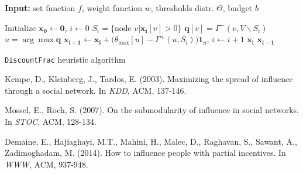 \documentclass[11pt]{article}
\renewcommand{\algorithmicrequire}{\textbf{Input:}}  %
\begin{document}
\begin{algorithm}[H]
	\algorithmicrequire { set function $f$, weight function $w$, thresholds distr. $\Theta$, budget $b$}
	\begin{algorithmic}
		\State Initialize $\mathbf{x_0} \leftarrow \mathbf{0}$, $i\leftarrow 0$
		\State $S_i = \{\text{node } v | \mathbf{x_i}[v] > 0\}$
		\State $\mathbf{q}[v] = \Gamma^-(v, V\backslash S_i)$
		\EndFor
		\State $u = \arg\max \mathbf{q}$
		\State $\mathbf{x_{i+1}} \leftarrow \mathbf{x_i} + \Big( \theta_{\max}[u] - \Gamma^+(u,S_i)\Big) \mathbf{1}_{u}$, $i\leftarrow i + 1$
		\EndWhile
		\State \Return $\mathbf{x_i}$
		\Else
		\State \Return $\mathbf{x_{i-1}}$
		\EndIf
	\end{algorithmic}
	\caption{\texttt{DiscountFrac} heuristic algorithm} \label{alg:frac_greedy}
\end{algorithm}





\begin{thebibliography}{}
	
	Kempe, D., Kleinberg, J., Tardos, E. (2003).
	\newblock Maximizing the spread of influence through a social network.
	\newblock In {\em KDD}, ACM, 137-146.
	
	Mossel, E., Roch, S. (2007).
	\newblock On the submodularity of influence in social networks.
	\newblock In {\em STOC}, ACM, 128-134.
	
	Demaine, E., Hajiaghayi, M.T., Mahini, H., Malec, D., Raghavan, S., Sawant, A., Zadimoghadam, M. (2014).
	\newblock How to influence people with partial incentives.
	\newblock In {\em WWW}, ACM, 937-948.

\end{thebibliography}
\end{document}
